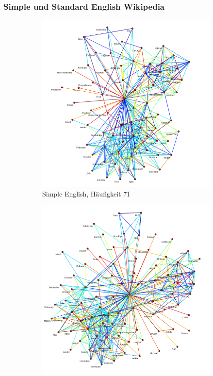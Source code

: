 \documentclass[11pt, a4paper]{article}
\begin{document}
\pagebreak
\subsubsection{Simple und Standard English Wikipedia}

\begin{figure}[hp!]
    \centering
    \begin{subfigure}[b]{0.5\textwidth}
        \includegraphics[scale=.25]{../../data/results/cooc_wiki_sim/topwords-t0005/graph_born.pdf}
        \caption{Simple English, Häufigkeit 71}
    \end{subfigure}
    \begin{subfigure}[b]{0.5\textwidth}
        \includegraphics[scale=.25]{../../data/results/cooc_wiki_en/topwords-t0005/graph_born.pdf}

\end{subfigure}
\end{figure}
\end{document}
